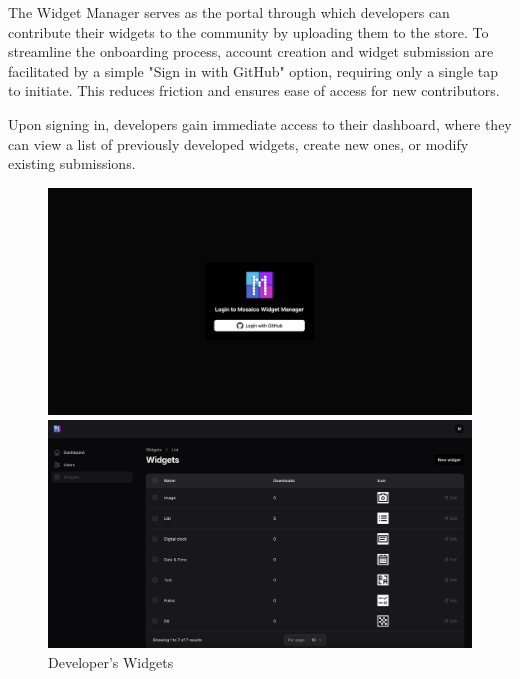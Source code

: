 The Widget Manager serves as the portal through which developers can contribute their widgets to the community by uploading them to the store. To streamline the onboarding process, account creation and widget submission are facilitated by a simple "Sign in with GitHub" option, requiring only a single tap to initiate. This reduces friction and ensures ease of access for new contributors.

Upon signing in, developers gain immediate access to their dashboard, where they can view a list of previously developed widgets, create new ones, or modify existing submissions.

\begin{figure}[h] \centering \begin{minipage}[b]{0.49\textwidth} \centering \includegraphics[width=\textwidth]{tesi/img/website_demo/login.png} \caption*{Login with GitHub} \end{minipage} \begin{minipage}[b]{0.49\textwidth} \centering \includegraphics[width=\textwidth]{tesi/img/website_demo/widgets.png} \caption*{Developer's Widgets} \end{minipage} \end{figure}


